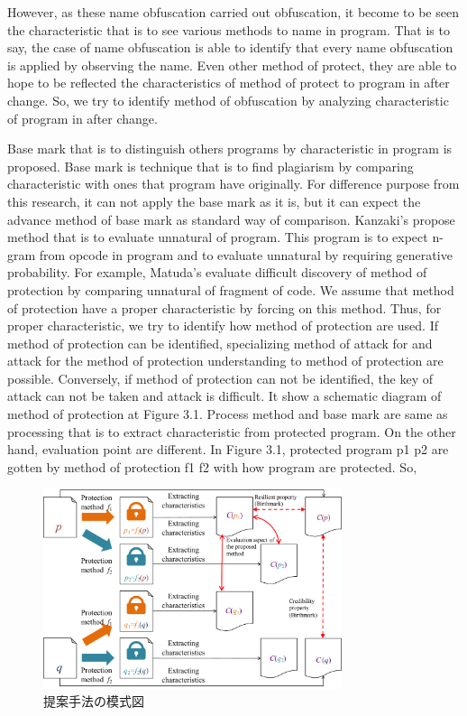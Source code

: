 \documentclass[conference]{IEEEtran}
\begin{document}
However, as these name obfuscation carried out obfuscation, it become to be seen the characteristic that is to see various methods to name in program.
That is to say, the case of name obfuscation is able to identify that every name obfuscation is applied by observing the name.
Even other method of protect, they are able to hope to be reflected the characteristics of method of protect to program in after change.
So, we try to identify method of obfuscation by analyzing characteristic of program in after change.

Base mark that is to distinguish others programs by characteristic in program is proposed.
Base mark is technique that is to find plagiarism by comparing characteristic with ones that program have originally.
For difference purpose from this research, it can not apply the base mark as it is, but it can expect the advance method of base mark as standard way of comparison.
Kanzaki's propose method that is to evaluate unnatural of program.
This program is to expect n-gram from opcode in program and to evaluate unnatural by requiring generative probability.
For example, Matuda's evaluate difficult discovery of method of protection by comparing unnatural of fragment of code.
We assume that method of protection have a proper characteristic by forcing on this method.
Thus, for proper characteristic, we try to identify how method of protection are used.
If method of protection can be identified, specializing method of attack for  and attack for the method of protection understanding to method of protection are possible.
Conversely, if method of protection can not be identified, the key of attack can not be taken  and attack is difficult.
It show a schematic diagram of method of protection at Figure 3.1.
Process method and base mark are same as processing that is to extract characteristic from protected program.
On the other hand, evaluation point are different.
In Figure 3.1, protected program p1 p2 are gotten by method of protection f1 f2 with how program are protected.
So,
\begin{figure}[b]
  \centering
  \includegraphics[width=0.78\textwidth]{images/key_idea}
  \caption{提案手法の模式図}\label{fig:keyidea}
\end{figure}
\end{document}
